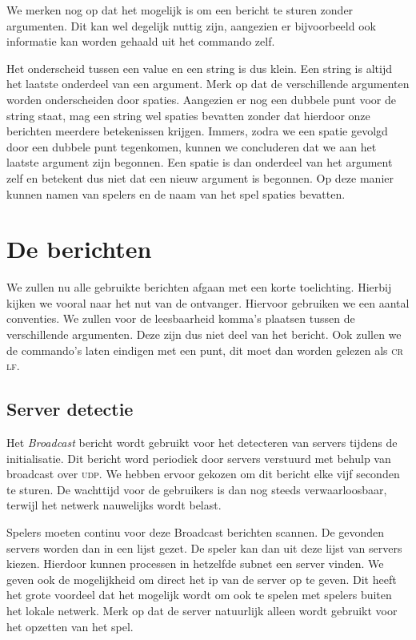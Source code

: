 \documentclass[a4paper,11pt]{article}
\newcommand{\udp}{\textsc{udp}\xspace}
\begin{document}
    We merken nog op dat het mogelijk is om een bericht te sturen zonder argumenten. Dit kan wel degelijk nuttig zijn, aangezien er bijvoorbeeld ook informatie kan worden gehaald uit het commando zelf.

    Het onderscheid tussen een value en een string is dus klein. Een string is altijd het laatste onderdeel van een argument. Merk op dat de verschillende argumenten worden onderscheiden door spaties. Aangezien er nog een dubbele punt voor de string staat, mag een string wel spaties bevatten zonder dat hierdoor onze berichten meerdere betekenissen krijgen. Immers, zodra we een spatie gevolgd door een dubbele punt tegenkomen, kunnen we concluderen dat we aan het laatste argument zijn begonnen. Een spatie is dan onderdeel van het argument zelf en betekent dus niet dat een nieuw argument is begonnen. Op deze manier kunnen namen van spelers en de naam van het spel spaties bevatten.

    \section{De berichten}
    We zullen nu alle gebruikte berichten afgaan met een korte toelichting. Hierbij kijken we vooral naar het nut van de ontvanger. Hiervoor gebruiken we een aantal conventies. We zullen voor de leesbaarheid komma's plaatsen tussen de verschillende argumenten. Deze zijn dus niet deel van het bericht. Ook zullen we de commando's laten eindigen met een punt, dit moet dan worden gelezen als \textsc{cr lf}.

    \subsection{Server detectie}
    Het \emph{Broadcast} bericht wordt gebruikt voor het detecteren van servers tijdens de initialisatie. Dit bericht word periodiek door servers verstuurd met behulp van broadcast over \udp. We hebben ervoor gekozen om dit bericht elke vijf seconden te sturen. De wachttijd voor de gebruikers is dan nog steeds verwaarloosbaar, terwijl het netwerk nauwelijks wordt belast.

    Spelers moeten continu voor deze Broadcast berichten scannen. De gevonden servers worden dan in een lijst gezet. De speler kan dan uit deze lijst van servers kiezen. Hierdoor kunnen processen in hetzelfde subnet een server vinden. We geven ook de mogelijkheid om direct het ip van de server op te geven. Dit heeft het grote voordeel dat het mogelijk wordt om ook te spelen met spelers buiten het lokale netwerk. Merk op dat de server natuurlijk alleen wordt gebruikt voor het opzetten van het spel.
\end{document}
